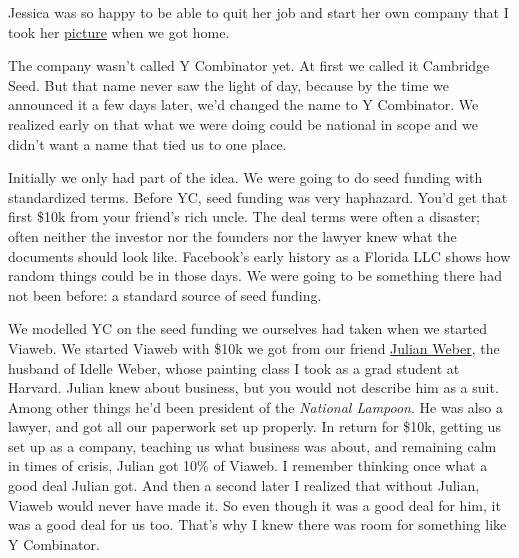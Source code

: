                   
                    Jessica was so happy to be able to quit her job and start
                    her own company that I took her
                    \href{https://web.archive.org/web/20170609055553/http://www.ycombinator.com/yc05.html}{picture}
                    when we got home.
                  


                  
                    The company wasn't called Y Combinator yet. At first we
                    called it Cambridge Seed. But that name never saw the light
                    of day, because by the time we announced it a few days
                    later, we'd changed the name to Y Combinator. We realized
                    early on that what we were doing could be national in scope
                    and we didn't want a name that tied us to one place.
                  


                  
                    Initially we only had part of the idea. We were going to do
                    seed funding with standardized terms. Before YC, seed
                    funding was very haphazard. You'd get that first \$10k from
                    your friend's rich uncle. The deal terms were often a
                    disaster; often neither the investor nor the founders nor
                    the lawyer knew what the documents should look like.
                    Facebook's early history as a Florida LLC shows how random
                    things could be in those days. We were going to be something
                    there had not been before: a standard source of seed
                    funding.
                  


                  
                    We modelled YC on the seed funding we ourselves had taken
                    when we started Viaweb. We started Viaweb with \$10k we got
                    from our friend
                    \href{http://www.paulgraham.com/julian.html}{Julian Weber}, the husband of Idelle Weber, whose painting class I took
                    as a grad student at Harvard. Julian knew about business,
                    but you would not describe him as a suit. Among other things
                    he'd been president of the \emph{National Lampoon}. He was
                    also a lawyer, and got all our paperwork set up properly. In
                    return for \$10k, getting us set up as a company, teaching us
                    what business was about, and remaining calm in times of
                    crisis, Julian got 10\% of Viaweb. I remember thinking once
                    what a good deal Julian got. And then a second later I
                    realized that without Julian, Viaweb would never have made
                    it. So even though it was a good deal for him, it was a good
                    deal for us too. That's why I knew there was room for
                    something like Y Combinator.
                  


